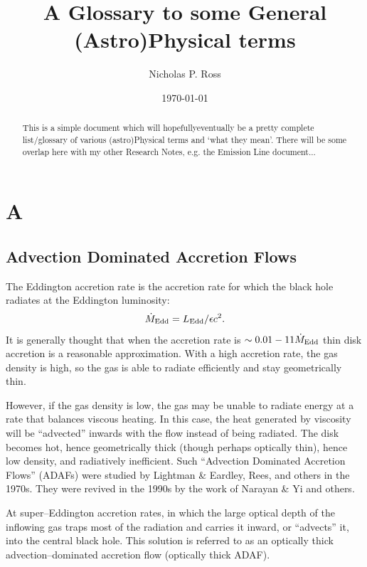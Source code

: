 \documentclass[11pt]{article}
\begin{document}
\title{A Glossary to some General (Astro)Physical terms}
\author{Nicholas P. Ross}
\date{\today}
\maketitle


\begin{abstract}
This is a simple document which will hopefully\/eventually be a pretty
complete list/glossary of various (astro)Physical terms and `what they
mean'. There will be some overlap here with my other Research Notes,
e.g. the Emission Line document...
\end{abstract}

\section{A}
\subsection{Advection Dominated Accretion Flows}
The Eddington accretion rate is the accretion rate for which the black
hole radiates at the Eddington luminosity:
\begin{equation} 
    \dot{M}_{\rm Edd} = L_{\rm Edd} /\epsilon c^{2}.
\end{equation} 
It is generally thought that when the accretion rate is $\sim0.01-11
\dot{M}_{\rm Edd}$ thin disk accretion is a reasonable approximation.
With a high accretion rate, the gas density is high, so the gas is
able to radiate efficiently and stay geometrically thin.

However, if the gas density is low, the gas may be unable to radiate
energy at a rate that balances viscous heating.  In this case, the
heat generated by viscosity will be ``advected'' inwards with the flow
instead of being radiated. The disk becomes hot, hence geometrically
thick (though perhaps optically thin), hence low density, and
radiatively inefficient.  Such ``Advection Dominated Accretion Flows''
(ADAFs) were studied by Lightman \& Eardley, Rees, and others in the
1970s. They were revived in the 1990s by the work of Narayan \& Yi and
others.

At super–Eddington accretion rates, in which the large optical depth
of the inflowing gas traps most of the radiation and carries it
inward, or “advects” it, into the central black hole. This solution is
referred to as an optically thick advection–dominated accretion flow
(optically thick ADAF).
\end{document}
